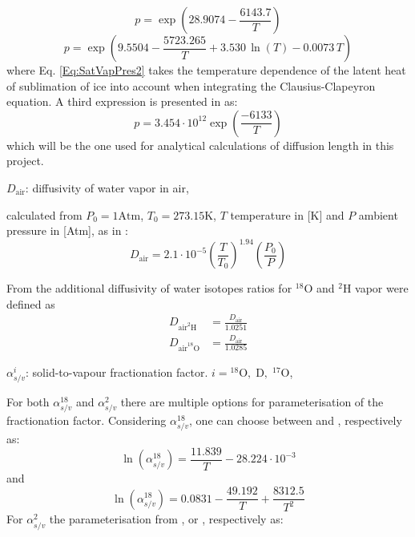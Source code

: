 \documentclass[../../CompleteThesis/Complete_1stDraft.tex]{subfiles}
\begin{document}
\begin{equation}
	p = \exp\left(28.9074 - \frac{6143.7}{T}\right)
	\label{Eq:SatVapPres1}
\end{equation}
\begin{equation}
	p = \exp\left(9.5504 - \frac{5723.265}{T} + 3.530\, \ln(T) - 0.0073 \, T\right)
	\label{Eq:SatVapPres2}
\end{equation}
where Eq. \ref{Eq:SatVapPres2} takes the temperature dependence of the latent heat of sublimation of ice into account when integrating the Clausius-Clapeyron equation.
A third expression is presented in \cite[Johnsen et al., 2000]{Johnsen2000a} as:
\begin{equation}
	p = 3.454 \cdot 10^{12} \exp\left(\frac{-6133}{T}\right)
	\label{Eq:SatVapPres3}
\end{equation}
which will be the one used for analytical calculations of diffusion length in this project.


$D_{\text{air}}$: diffusivity of water vapor in air,

calculated from $P_0 = 1 \text{Atm}$, $T_0 = 273.15 \text{K}$, $T$ temperature in [K] and $P$ ambient pressure in [Atm], as in \cite[Hall and Prupacher, 1976]{HallPrupacher1976}:
\begin{equation}
	D_{\text{air}} = 2.1 \cdot 10^{-5} \left(\frac{T}{T_0}\right)^{1.94}\left(\frac{P_0}{P}\right)
	\label{Eq:DiffusivAir}
\end{equation}

From \cite[Merlivat, 1978]{Merlivat1978} the additional diffusivity of water isotopes ratios for $^{18}$O and $^2$H vapor were defined as 
\begin{align}
	D_{\text{air}^2\text{H}} &= \frac{D_{\text{air}}}{1.0251} \\
	D_{\text{air}^{18}\text{O}} &= \frac{D_{\text{air}}}{1.0285} 	
\end{align}

$\alpha_{s/v}^i$: solid-to-vapour fractionation factor. $i = {^{18}\text{O},\; \text{D}},\; ^{17}\text{O}$,

For both $\alpha_{s/v}^{18}$ and $\alpha_{s/v}^{2}$ there are multiple options for parameterisation of the fractionation factor. Considering $\alpha_{s/v}^{18}$, one can choose between \cite[Majoube 1971]{Majoube1970} and \cite[Elleh\o j et al., 2013]{Ellehoj2013}, respectively as:
\begin{equation}
	\ln(\alpha_{s/v}^{18}) = \frac{11.839}{T} - 28.224\cdot 10^{-3}
	\label{Eq:FractFact18_Majoube}
\end{equation}
and
\begin{equation}
	\ln(\alpha_{s/v}^{18}) = 0.0831 - \frac{49.192}{T} + \frac{8312.5}{T^2}
	\label{Eq:FractFact18_Ellehoj}
\end{equation}
For $\alpha_{s/v}^{2}$ the parameterisation from \cite[Merlivat and Nief, 1967]{MerlivatNief1967}, \cite[Elleh\o j et al., 2013]{Ellehoj2013} or \cite[Lamb et al., 2017]{Lamb2017}, respectively as:
\end{document}
